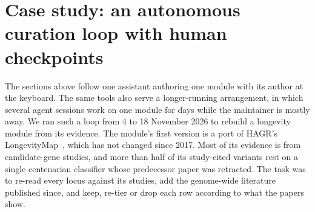 %
%

\section{Case study: an autonomous curation loop with human checkpoints}
\label{sec:loop}

The sections above follow one assistant authoring one module with its author
at the keyboard. The same tools also serve a longer-running arrangement, in
which several agent sessions work on one module for days while the maintainer
is mostly away. We ran such a loop from 4 to 18 November 2026 to rebuild a
longevity module from its evidence. The module's first version is a port of
HAGR's LongevityMap~\citep{budovsky2013longevitymap}, which has not changed
since 2017. Most of its evidence is from candidate-gene studies, and more than
half of its study-cited variants rest on a single centenarian classifier whose
predecessor paper was retracted. The task was to re-read every locus against
its studies, add the genome-wide literature published since, and keep, re-tier
or drop each row according to what the papers show.


